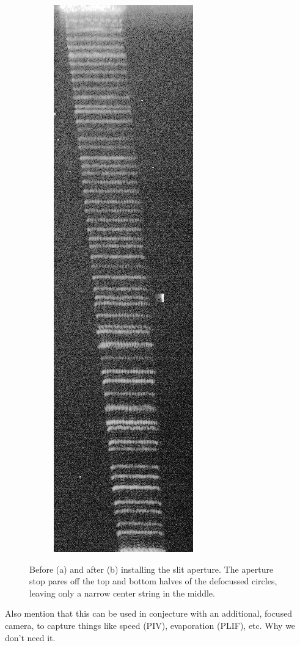 \documentclass[11.5pt]{book}
\begin{document}
\begin{figure}[h!]
\begin{subfigure}[b]{0.4\textwidth}
        \includegraphics[height=0.6\textheight]{img/slitted.jpg}
        \caption{}
    \end{subfigure}
    \caption{Before (a) and after (b) installing the slit aperture. The aperture
    stop pares off the top and bottom halves of the defocussed circles, leaving
only a narrow center string in the middle.}
    \label{fig:globalsizing}
\end{figure}
Also mention that this can be used in conjecture with an additional, focused
camera, to capture things like speed (PIV), evaporation (PLIF), etc. Why we
don't need it.
\end{document}
